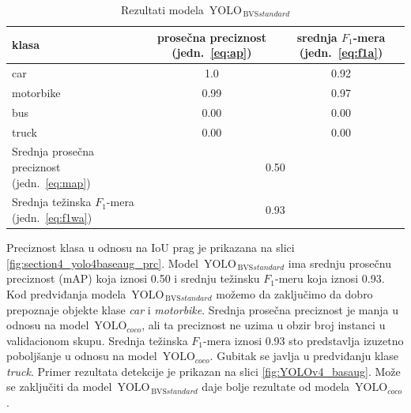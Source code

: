 \documentclass[12pt,oneside]{memoir}
\newcommand{\yolo}{\ensuremath{\,\textrm{YOLO}}}
\newcommand{\bvs}{\ensuremath{\,\textrm{BVS}}}
\begin{document}
\begin{table}
    \begin{center}
    \caption{Rezultati modela $\yolo_{\bvs{standard}}$}
        \begin{tabular}{|m{10em}|c|c|}
        \toprule
        klasa     & prosečna preciznost (jedn.~\ref{eq:ap}) & srednja $F_1$-mera (jedn.~\ref{eq:f1a})  \\ \hline
        \midrule
        car       & 1.0  & 0.92 \\ \hline
        motorbike & 0.99   & 0.97 \\ \hline
        bus       & 0.00   & 0.00 \\ \hline
        truck     & 0.00   & 0.00 \\ \hline
        \bottomrule
        Srednja prosečna preciznost (jedn.~\ref{eq:map}) & \multicolumn{2}{c|}{0.50}  \\ \hline
        Srednja težinska $F_1$-mera (jedn.~\ref{eq:f1wa}) & \multicolumn{2}{c|}{0.93}  \\ \hline
    \end{tabular}
    \label{tab:section4_yolo4baseaug_results}
    \end{center}
\end{table}

Preciznost klasa u odnosu na IoU prag je prikazana na slici \ref{fig:section4_yolo4baseaug_prc}. Model  $\yolo_{\bvs{standard}}$ ima srednju prosečnu preciznost (mAP) koja iznosi 0.50 i srednju težinsku $F_1$-meru koja iznosi 0.93. Kod predviđanja modela  $\yolo_{\bvs{standard}}$ možemo da zaključimo da dobro prepoznaje objekte klase \textit{car} i \textit{motorbike}. Srednja prosečna preciznost je manja u odnosu na model $\yolo_{coco}$, ali ta preciznost ne uzima u obzir broj instanci u validacionom skupu. Srednja težinska $F_1$-mera iznosi 0.93 sto predstavlja izuzetno poboljšanje u odnosu na model $\yolo_{coco}$. Gubitak se javlja u predviđanju klase \textit{truck}. Primer rezultata detekcije je prikazan na slici \ref{fig:YOLOv4_basaug}. Može se zaključiti da model  $\yolo_{\bvs{standard}}$ daje bolje rezultate od modela $\yolo_{coco}$.
\end{document}
